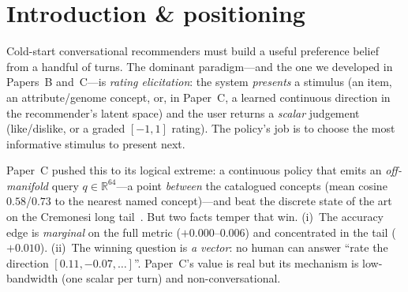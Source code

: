 \documentclass[11pt]{article}
\newcommand{\R}{\mathbb{R}}
\begin{document}
\begin{abstract}
\emph{interpretable question sequence}. A modal-path control shows the per-user \emph{branching} it also performs is
value-neutral ($+0.002$ tail; $49$--$63\%$ of users leave the modal path by five turns but the ranking does not move),
so, because the recommender is a permutation-invariant set encoder, the gain is better \emph{sequencing} and adaptivity
buys \emph{efficiency, not a higher ceiling}. A \emph{jointly
trained} open$+$closed policy then learns---on its own---the open-anchor$\to$closed-refine schedule (the closed continuous
probe is unused early and dominates the final turns), the complementarity a frozen bolt-on cannot realise. Against
probe-family baselines on the identical ruler and matched geometric answerer (ConTS, a geometric reduction of PEBOL,
Paper~C's latent probe, entropy-over-concepts), open recall wins on both axes. We close with honest ablations
(REINFORCE beats a differentiable Gumbel trainer for this discrete action; sequencing only helps under the deployability
constraint). LLM realisation and a deployed interface are deferred to the final paper.
\end{abstract}

\section{Introduction \& positioning}
\label{sec:intro}
Cold-start conversational recommenders must build a useful preference belief from a handful of turns. The dominant
paradigm---and the one we developed in Papers~B and~C---is \emph{rating elicitation}: the system \emph{presents} a
stimulus (an item, an attribute/genome concept, or, in Paper~C, a learned continuous direction in the recommender's
latent space) and the user returns a \emph{scalar} judgement (like/dislike, or a graded $[-1,1]$ rating). The policy's
job is to choose the most informative stimulus to present next.

Paper~C pushed this to its logical extreme: a continuous policy that emits an \emph{off-manifold} query
$q\in\R^{64}$---a point \emph{between} the catalogued concepts (mean cosine $0.58$/$0.73$ to the nearest named
concept)---and beat the discrete state of the art on the Cremonesi long tail~\cite{cremonesi10}. But two facts temper that win.
(i)~The accuracy edge is \emph{marginal} on the full metric ($+0.000\text{--}0.006$) and concentrated in the tail
($+0.010$). (ii)~The winning question is \emph{a vector}: no human can answer ``rate the direction
$[0.11,-0.07,\dots]$''. Paper~C's value is real but its mechanism is low-bandwidth (one scalar per turn) and
non-conversational.
\end{document}
